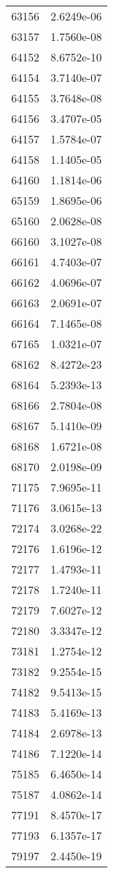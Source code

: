\begin{table}[h!]
\begin{tabular}{|| c || c |}
63156 & 2.6249e-06 \\
63157 & 1.7560e-08 \\
64152 & 8.6752e-10 \\
64154 & 3.7140e-07 \\
64155 & 3.7648e-08 \\
64156 & 3.4707e-05 \\
64157 & 1.5784e-07 \\
64158 & 1.1405e-05 \\
64160 & 1.1814e-06 \\
65159 & 1.8695e-06 \\
65160 & 2.0628e-08 \\
66160 & 3.1027e-08 \\
66161 & 4.7403e-07 \\
66162 & 4.0696e-07 \\
66163 & 2.0691e-07 \\
66164 & 7.1465e-08 \\
67165 & 1.0321e-07 \\
68162 & 8.4272e-23 \\
68164 & 5.2393e-13 \\
68166 & 2.7804e-08 \\
68167 & 5.1410e-09 \\
68168 & 1.6721e-08 \\
68170 & 2.0198e-09 \\
71175 & 7.9695e-11 \\
71176 & 3.0615e-13 \\
72174 & 3.0268e-22 \\
72176 & 1.6196e-12 \\
72177 & 1.4793e-11 \\
72178 & 1.7240e-11 \\
72179 & 7.6027e-12 \\
72180 & 3.3347e-12 \\
73181 & 1.2754e-12 \\
73182 & 9.2554e-15 \\
74182 & 9.5413e-15 \\
74183 & 5.4169e-13 \\
74184 & 2.6978e-13 \\
74186 & 7.1220e-14 \\
75185 & 6.4650e-14 \\
75187 & 4.0862e-14 \\
77191 & 8.4570e-17 \\
77193 & 6.1357e-17 \\
79197 & 2.4450e-19 \\

\end{tabular}
\end{table}
